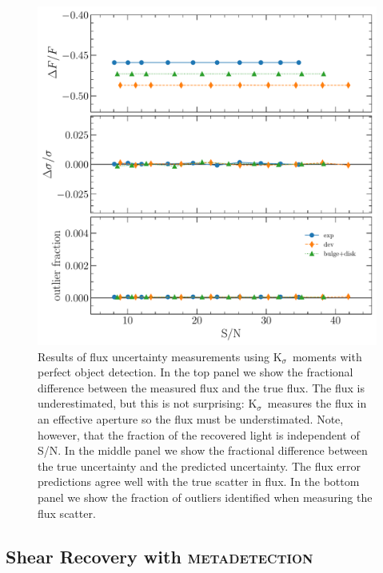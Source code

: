 \documentclass[twocolappendix, appendixfloats, numberedappendix, twocolumn, apj]{openjournal}
\newcommand{\mdet}{\textsc{metadetection}\xspace}
\newcommand{\ksigma}{\mbox{\boldmath $\mathrm{K}_{\sigma}$}\xspace}
\begin{document}
\begin{figure}
    \includegraphics[width=\columnwidth]{figures/test-noround-nodetect.pdf}

    \caption{ Results of flux uncertainty measurements using \ksigma\ moments
    with perfect object detection.  In the top panel we show the fractional
    difference between the measured flux and the true flux. The flux is
    underestimated, but this is not surprising: \ksigma\ measures the flux in
    an effective aperture so the flux must be understimated. Note, however,
    that the fraction of the recovered light is independent of S/N.  In the
    middle panel we show the fractional difference between the true uncertainty
    and the predicted uncertainty.  The flux error predictions agree well with
    the true scatter in flux.  In the bottom panel we show the fraction of
    outliers identified when measuring the flux scatter.
    \label{fig:noround_nodetect}}

\end{figure}


\subsection{Shear Recovery with \mdet}
\end{document}
